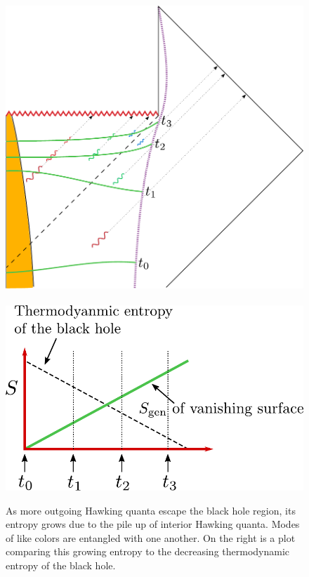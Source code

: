 \begin{figure}[h]
\begin{center}
\includegraphics[scale=0.39]{figures/nicesliceentropy.pdf}
 \ \ \ \ \ \ \includegraphics[scale=0.56]{figures/trivialcurve.pdf}
\caption{As more outgoing Hawking quanta escape the black hole region, its entropy grows due to the pile up of interior Hawking quanta. Modes of like colors are entangled with one another. On the right is a plot comparing this growing entropy to the decreasing thermodynamic entropy of the black hole. }
\label{nicesliceentropy}
\end{center}
\end{figure}

